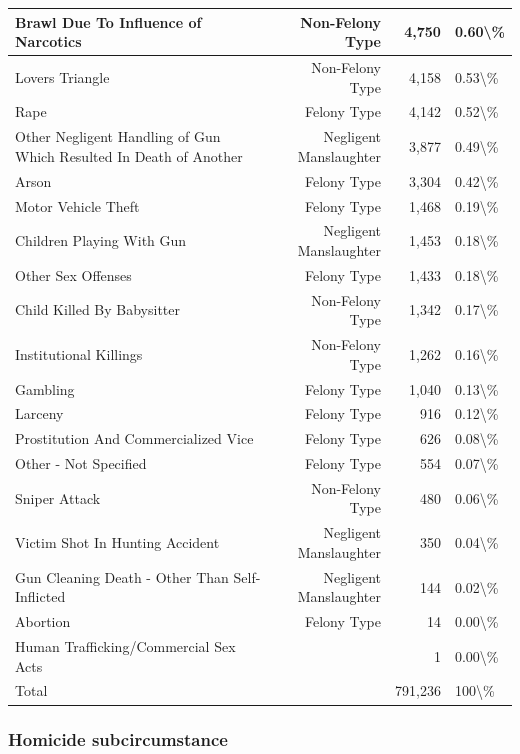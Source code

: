 \documentclass[
]{krantz}
\begin{document}
\begin{longtable}[t]{l|r|r|l}
\hline
Brawl Due To Influence of Narcotics & Non-Felony Type & 4,750 & 0.60\textbackslash{}\%\\
\hline
Lovers Triangle & Non-Felony Type & 4,158 & 0.53\textbackslash{}\%\\
\hline
Rape & Felony Type & 4,142 & 0.52\textbackslash{}\%\\
\hline
Other Negligent Handling of Gun Which Resulted In Death of Another & Negligent Manslaughter & 3,877 & 0.49\textbackslash{}\%\\
\hline
Arson & Felony Type & 3,304 & 0.42\textbackslash{}\%\\
\hline
Motor Vehicle Theft & Felony Type & 1,468 & 0.19\textbackslash{}\%\\
\hline
Children Playing With Gun & Negligent Manslaughter & 1,453 & 0.18\textbackslash{}\%\\
\hline
Other Sex Offenses & Felony Type & 1,433 & 0.18\textbackslash{}\%\\
\hline
Child Killed By Babysitter & Non-Felony Type & 1,342 & 0.17\textbackslash{}\%\\
\hline
Institutional Killings & Non-Felony Type & 1,262 & 0.16\textbackslash{}\%\\
\hline
Gambling & Felony Type & 1,040 & 0.13\textbackslash{}\%\\
\hline
Larceny & Felony Type & 916 & 0.12\textbackslash{}\%\\
\hline
Prostitution And Commercialized Vice & Felony Type & 626 & 0.08\textbackslash{}\%\\
\hline
Other - Not Specified & Felony Type & 554 & 0.07\textbackslash{}\%\\
\hline
Sniper Attack & Non-Felony Type & 480 & 0.06\textbackslash{}\%\\
\hline
Victim Shot In Hunting Accident & Negligent Manslaughter & 350 & 0.04\textbackslash{}\%\\
\hline
Gun Cleaning Death - Other Than Self-Inflicted & Negligent Manslaughter & 144 & 0.02\textbackslash{}\%\\
\hline
Abortion & Felony Type & 14 & 0.00\textbackslash{}\%\\
\hline
Human Trafficking/Commercial Sex Acts &  & 1 & 0.00\textbackslash{}\%\\
\hline
Total &  & 791,236 & 100\textbackslash{}\%\\
\hline
\end{longtable}

\subsubsection{Homicide
subcircumstance}\label{homicide-subcircumstance}
\end{document}
